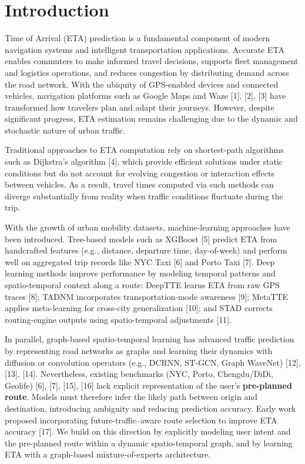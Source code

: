 \documentclass[
  10pt,
  letterpaper,
  lettersize,
  journal]{IEEEtran}
\begin{document}
\section{Introduction}\label{introduction}

 Time of Arrival (ETA) prediction is a
fundamental component of modern navigation systems and intelligent
transportation applications. Accurate ETA enables commuters to make
informed travel decisions, supports fleet management and logistics
operations, and reduces congestion by distributing demand across the
road network. With the ubiquity of GPS-enabled devices and connected
vehicles, navigation platforms such as Google Maps and Waze {[}1{]},
{[}2{]}, {[}3{]} have transformed how travelers plan and adapt their
journeys. However, despite significant progress, ETA estimation remains
challenging due to the dynamic and stochastic nature of urban traffic.

Traditional approaches to ETA computation rely on shortest-path
algorithms such as Dijkstra's algorithm {[}4{]}, which provide efficient
solutions under static conditions but do not account for evolving
congestion or interaction effects between vehicles. As a result, travel
times computed via such methods can diverge substantially from reality
when traffic conditions fluctuate during the trip.

With the growth of urban mobility datasets, machine-learning approaches
have been introduced. Tree-based models such as XGBoost {[}5{]} predict
ETA from handcrafted features (e.g., distance, departure time,
day-of-week) and perform well on aggregated trip records like NYC Taxi
{[}6{]} and Porto Taxi {[}7{]}. Deep learning methods improve
performance by modeling temporal patterns and spatio-temporal context
along a route: DeepTTE learns ETA from raw GPS traces {[}8{]}; TADNM
incorporates transportation-mode awareness {[}9{]}; MetaTTE applies
meta-learning for cross-city generalization {[}10{]}; and STAD corrects
routing-engine outputs using spatio-temporal adjustments {[}11{]}.

In parallel, graph-based spatio-temporal learning has advanced traffic
prediction by representing road networks as graphs and learning their
dynamics with diffusion or convolution operators (e.g., DCRNN, ST-GCN,
Graph WaveNet) {[}12{]}, {[}13{]}, {[}14{]}. Nevertheless, existing
benchmarks (NYC, Porto, Chengdu/DiDi, Geolife) {[}6{]}, {[}7{]},
{[}15{]}, {[}16{]} lack explicit representation of the user's
\textbf{pre-planned route}. Models must therefore infer the likely path
between origin and destination, introducing ambiguity and reducing
prediction accuracy. Early work proposed incorporating
future-traffic--aware route selection to improve ETA accuracy {[}17{]}.
We build on this direction by explicitly modeling user intent and the
pre-planned route within a dynamic spatio-temporal graph, and by
learning ETA with a graph-based mixture-of-experts architecture.
\end{document}
